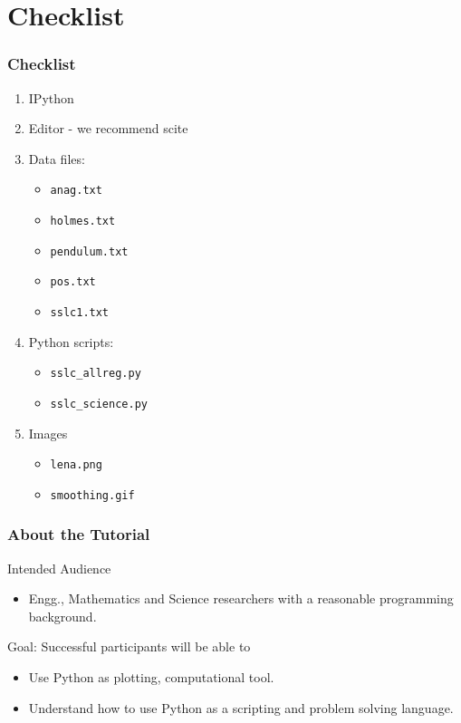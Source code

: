 \documentclass[14pt,compress]{beamer}
\newcommand{\typ}[1]{\lstinline{#1}}
\begin{document}
\section{Checklist}
\begin{frame}
\frametitle{Checklist}
  \begin{enumerate}
    \item IPython
    \item Editor - we recommend \alert{scite}
    \item Data files: 
      \begin{itemize}
      \item \typ{anag.txt}
      \item \typ{holmes.txt}
      \item \typ{pendulum.txt}
      \item \typ{pos.txt}
      \item \typ{sslc1.txt}
      \end{itemize}
    \item Python scripts: 
      \begin{itemize}
      \item \typ{sslc_allreg.py}
      \item \typ{sslc_science.py}
      \end{itemize}
    \item Images
      \begin{itemize}
      \item \typ{lena.png}
      \item \typ{smoothing.gif}
      \end{itemize}
  \end{enumerate}
\end{frame}

\begin{frame}
  \frametitle{About the Tutorial}
  \begin{block}{Intended Audience}
  \begin{itemize}
       \item Engg., Mathematics and Science researchers with a
           reasonable programming background.
  \end{itemize}
  \end{block}  

  \begin{block}{Goal: Successful participants will be able to}
    \begin{itemize}
      \item Use Python as plotting, computational tool.
      \item Understand how to use Python as a scripting and problem solving language.
    \end{itemize}
  \end{block}
\end{frame}
\end{document}
